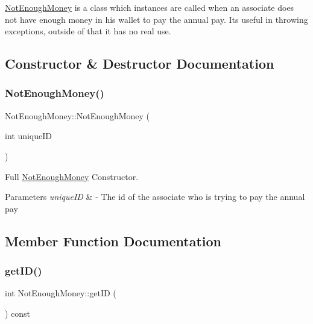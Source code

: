 \mbox{\hyperlink{classNotEnoughMoney}{Not\+Enough\+Money}} is a class which instances are called when an associate does not have enough money in his wallet to pay the annual pay. Its useful in throwing exceptions, outside of that it has no real use. 

\subsection{Constructor \& Destructor Documentation}
\mbox{\label{classNotEnoughMoney_a8d626cbca191437e4c16f3d058a7d204}} 
\subsubsection{\texorpdfstring{Not\+Enough\+Money()}{NotEnoughMoney()}}
{\footnotesize\ttfamily Not\+Enough\+Money\+::\+Not\+Enough\+Money (\begin{DoxyParamCaption}\item[{int}]{unique\+ID }\end{DoxyParamCaption})\hspace{0.3cm}{\ttfamily [inline]}}



Full \mbox{\hyperlink{classNotEnoughMoney}{Not\+Enough\+Money}} Constructor. 


\begin{DoxyParams}{Parameters}
{\em unique\+ID} & -\/ The id of the associate who is trying to pay the annual pay \\
\hline
\end{DoxyParams}


\subsection{Member Function Documentation}
\mbox{\label{classNotEnoughMoney_a7f6054f81a4a84f1e9f2cb3f24fc498b}} 
\subsubsection{\texorpdfstring{get\+I\+D()}{getID()}}
{\footnotesize\ttfamily int Not\+Enough\+Money\+::get\+ID (\begin{DoxyParamCaption}{ }\end{DoxyParamCaption}) const\hspace{0.3cm}{\ttfamily [inline]}}



